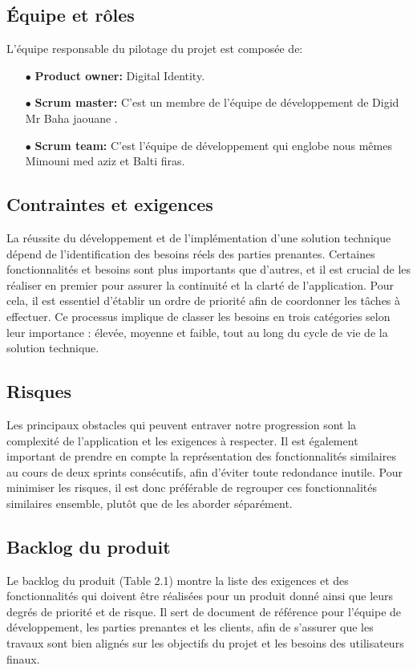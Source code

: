     \subsection{Équipe et rôles}
    L'équipe responsable du pilotage du projet est composée de:\\
    \begin{itemize}
    \item[$\bullet$]\textbf{Product owner: } Digital Identity.\\
    \item[$\bullet$]\textbf{Scrum master: } C'est un membre de l'équipe de développement de Digid Mr Baha jaouane . \\
    \item[$\bullet$]\textbf{Scrum team: }C'est l'équipe de développement qui englobe nous mêmes Mimouni med aziz  et Balti firas. \\
    \end{itemize}
      \subsection{Contraintes et exigences}
    La réussite du développement et de l'implémentation d'une solution technique dépend de l'identification des besoins réels des parties prenantes. Certaines fonctionnalités et besoins sont plus importants que d'autres, et il est crucial de les réaliser en premier pour assurer la continuité et la clarté de l'application. Pour cela, il est essentiel d'établir un ordre de priorité afin de coordonner les tâches à effectuer. Ce processus implique de classer les besoins en trois catégories selon leur importance : élevée, moyenne et faible, tout au long du cycle de vie de la solution technique.
    \subsection{Risques}
     Les principaux obstacles qui peuvent entraver notre progression sont la complexité de l'application et les exigences à respecter. Il est également important de prendre en compte la représentation des fonctionnalités similaires au cours de deux sprints consécutifs, afin d'éviter toute redondance inutile. Pour minimiser les risques, il est donc préférable de regrouper ces fonctionnalités similaires ensemble, plutôt que de les aborder séparément.
    \subsection{Backlog du produit}
    Le backlog du produit (Table 2.1) montre la liste des exigences et des fonctionnalités qui doivent être réalisées pour un produit donné ainsi que leurs degrés de priorité et de risque. Il sert de document de référence pour l'équipe de développement, les parties prenantes et les clients, afin de s'assurer que les travaux sont bien alignés sur les objectifs du projet et les besoins des utilisateurs finaux.


